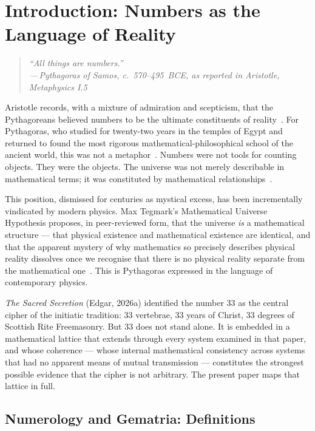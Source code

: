 \documentclass[12pt, a4paper]{article}
\newcommand{\epigraph}[2]{%
  \begin{quote}
    \itshape ``#1''\\[0.3em]
    \normalfont\small\hfill ---\,#2
  \end{quote}
}
\begin{document}
\newpage
\tableofcontents
\newpage

\section{Introduction: Numbers as the Language of Reality}

\epigraph{All things are numbers.}{Pythagoras of Samos, c.~570--495~BCE,
as reported in Aristotle, \emph{Metaphysics} I.5}

Aristotle records, with a mixture of admiration and scepticism, that the
Pythagoreans believed numbers to be the ultimate constituents of
reality~\autocite{aristotle_metaphysics}. For Pythagoras, who studied for
twenty-two years in the temples of Egypt and returned to found the most
rigorous mathematical-philosophical school of the ancient world, this was not
a metaphor~\autocite{iamblichus1818}. Numbers were not tools for counting
objects. They were the objects. The universe was not merely describable in
mathematical terms; it was constituted by mathematical
relationships~\autocite{pythagoras1926}.

This position, dismissed for centuries as mystical excess, has been
incrementally vindicated by modern physics. Max Tegmark's Mathematical
Universe Hypothesis proposes, in peer-reviewed form, that the universe
\emph{is} a mathematical structure — that physical existence and mathematical
existence are identical, and that the apparent mystery of why mathematics so
precisely describes physical reality dissolves once we recognise that there is
no physical reality separate from the mathematical one~\autocite[13]{livio2002}.
This is Pythagoras expressed in the language of contemporary physics.

\emph{The Sacred Secretion} (Edgar, 2026a) identified the number 33 as the
central cipher of the initiatic tradition: 33 vertebrae, 33 years of Christ,
33 degrees of Scottish Rite Freemasonry. But 33 does not stand alone. It is
embedded in a mathematical lattice that extends through every system examined
in that paper, and whose coherence — whose internal mathematical consistency
across systems that had no apparent means of mutual transmission — constitutes
the strongest possible evidence that the cipher is not arbitrary. The present
paper maps that lattice in full.

\subsection{Numerology and Gematria: Definitions}
\end{document}
